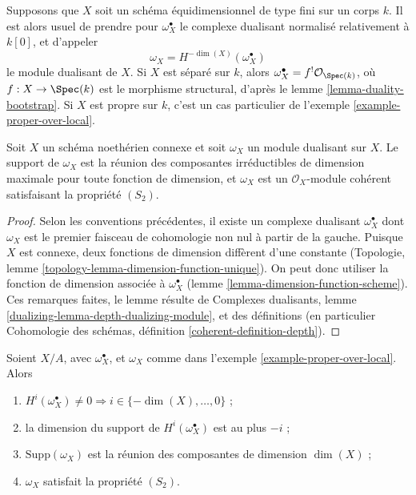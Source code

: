 \begin{example}
\label{example-equidimensional-over-field}
Supposons que $X$ soit un schéma équidimensionnel de type fini sur un corps $k$. Il est alors usuel de prendre pour $\omega_X^\bullet$ le complexe dualisant normalisé relativement à $k[0]$, et d'appeler
$$
\omega_X = H^{-\dim(X)}(\omega_X^\bullet)
$$
le module dualisant de $X$. Si $X$ est séparé sur $k$, alors $\omega_X^\bullet = f^!\mathcal{O}_{\Spec(k)}$, où $f : X \to \Spec(k)$ est le morphisme structural, d'après le lemme \ref{lemma-duality-bootstrap}. Si $X$ est propre sur $k$, c'est un cas particulier de l'exemple \ref{example-proper-over-local}.
\end{example}

\begin{lemma}
\label{lemma-dualizing-module}
Soit $X$ un schéma noethérien connexe et soit $\omega_X$ un module dualisant sur $X$. Le support de $\omega_X$ est la réunion des composantes irréductibles de dimension maximale pour toute fonction de dimension, et $\omega_X$ est un $\mathcal{O}_X$-module cohérent satisfaisant la propriété $(S_2)$.
\end{lemma}

\begin{proof}
Selon les conventions précédentes, il existe un complexe dualisant $\omega_X^\bullet$ dont $\omega_X$ est le premier faisceau de cohomologie non nul à partir de la gauche. Puisque $X$ est connexe, deux fonctions de dimension diffèrent d'une constante (Topologie, lemme \ref{topology-lemma-dimension-function-unique}). On peut donc utiliser la fonction de dimension associée à $\omega_X^\bullet$ (lemme \ref{lemma-dimension-function-scheme}). Ces remarques faites, le lemme résulte de Complexes dualisants, lemme \ref{dualizing-lemma-depth-dualizing-module}, et des définitions (en particulier Cohomologie des schémas, définition \ref{coherent-definition-depth}).
\end{proof}

\begin{lemma}
\label{lemma-vanishing-good-dualizing}
Soient $X/A$, avec $\omega_X^\bullet$, et $\omega_X$ comme dans l'exemple \ref{example-proper-over-local}. Alors
\begin{enumerate}
\item $H^i(\omega_X^\bullet) \not = 0 \Rightarrow
i \in \{-\dim(X), \ldots, 0\}$ ;
\item la dimension du support de $H^i(\omega_X^\bullet)$ est au plus $-i$ ;
\item $\text{Supp}(\omega_X)$ est la réunion des composantes de dimension $\dim(X)$ ;
\item $\omega_X$ satisfait la propriété $(S_2)$.
\end{enumerate}
\end{lemma}

